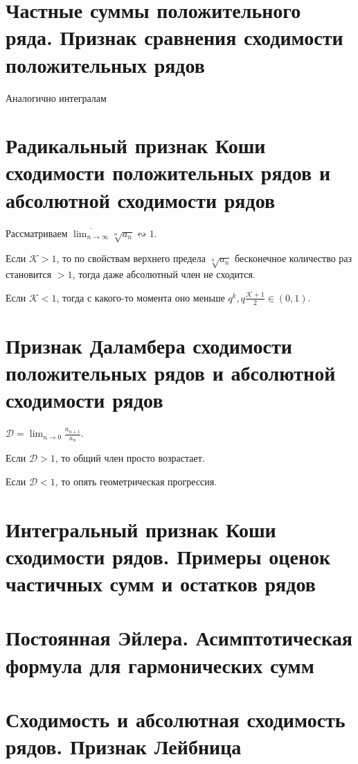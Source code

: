 \documentclass[12pt, a4paper]{article}
\begin{document}
\section{Частные суммы положительного ряда. Признак сравнения сходимости положительных рядов}

    Аналогично интегралам

\section{Радикальный признак Коши сходимости положительных рядов и абсолютной сходимости рядов}

    Рассматриваем $\overline{\lim_{n → \infty}} \sqrt[n]{a_n} \leftrightsquigarrow 1$.

    Если $\mathcal{K} > 1$, то по свойствам верхнего предела $\sqrt[n]{a_n}$ бесконечное количество раз становится $>1$, тогда даже абсолютный член не сходится.

    Если $\mathcal{K} < 1$, тогда с какого-то момента оно меньше $q^k, q \frac{\mathcal{K} + 1}{2} \in (0, 1)$.

\section{Признак Даламбера сходимости положительных рядов и абсолютной сходимости рядов}

    $\mathcal{D} = \lim_{n → 0} \frac{a_{n + 1}}{a_n}$.

    Если $\mathcal{D} > 1$, то общий член просто возрастает.
 
    Если $\mathcal{D} < 1$, то опять геометрическая прогрессия.


\section{Интегральный признак Коши сходимости рядов. Примеры оценок частичных сумм и остатков рядов}



\section{Постоянная Эйлера. Асимптотическая формула для гармонических сумм}



\section{Сходимость и абсолютная сходимость рядов. Признак Лейбница}
\end{document}
